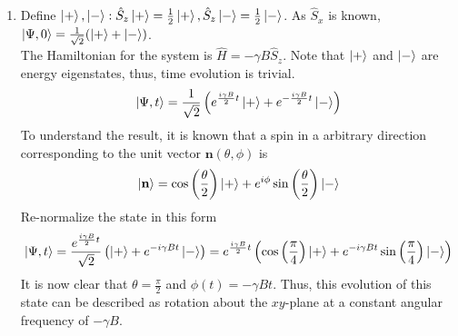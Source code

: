\begin{sol}
\begin{enumerate}[label=\textbf{(\alph*)}]
\item
Define $\ket+,\ket-:\hat S_z\ket+=\frac{1}{2}\ket+,\hat S_z\ket-=\frac{1}{2}\ket-$. As $\hat S_x$ is known, $\ket{\Psi,0}=\frac{1}{\sqrt{2}}(\ket++\ket-)$.\\
The Hamiltonian for the system is $\hat H=-\gamma B\hat S_z$. Note that $\ket+$ and $\ket-$ are energy eigenstates, thus, time evolution is trivial.
\begin{equation}
	\ket{\Psi,t}=\frac{1}{\sqrt{2}}\left(e^{\frac{i\gamma B}{2}t}\ket++e^{-\frac{i\gamma B}{2}t}\ket-\right)
\end{equation} 
To understand the result, it is known that a spin in a arbitrary direction corresponding to the unit vector $\mathbf n(\theta, \phi)$ is
\begin{equation}
	\ket{\mathbf{n}}=\cos\left(\frac{\theta}{2}\right)\ket{+}+e^{i\phi}\sin\left(\frac{\theta}{2}\right)\ket{-}
\end{equation}
Re-normalize the state in this form
\begin{equation}
	\ket{\Psi,t}=\frac{e^{\frac{i\gamma B}{2}t}}{\sqrt{2}}\left(\ket++e^{-i\gamma Bt}\ket-\right)=e^{\frac{i\gamma B}{2}t}\left(\cos\Big(\frac{\pi}{4}\Big)\ket++e^{-i\gamma Bt}\sin\Big(\frac{\pi}{4}\Big)\ket-\right)
\end{equation}
It is now clear that $\theta=\frac{\pi}{2}$ and $\phi(t)=-\gamma Bt$. Thus, this evolution of this state can be described as rotation about the $xy$-plane at a constant angular frequency of $-\gamma B$.


\end{enumerate}
\end{sol}
